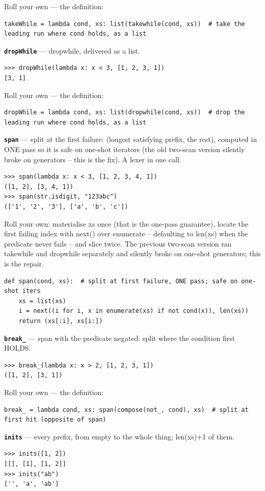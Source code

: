 \documentclass[10pt,letterpaper]{article}
\begin{document}
Roll your own --- the definition:

\begin{lstlisting}[style=ex]
takeWhile = lambda cond, xs: list(takewhile(cond, xs))  # take the leading run where cond holds, as a list
\end{lstlisting}
\textbf{\texttt{dropWhile}} --- dropwhile, delivered as a list.
\begin{lstlisting}[style=ex]
>>> dropWhile(lambda x: x < 3, [1, 2, 3, 1])
[3, 1]
\end{lstlisting}

Roll your own --- the definition:

\begin{lstlisting}[style=ex]
dropWhile = lambda cond, xs: list(dropwhile(cond, xs))  # drop the leading run where cond holds, as a list
\end{lstlisting}
\textbf{\texttt{span}} --- split at the first failure: (longest satisfying prefix, the rest), computed in ONE pass so it is safe on one-shot iterators (the old two-scan version silently broke on generators -- this is the fix). A lexer in one call.
\begin{lstlisting}[style=ex]
>>> span(lambda x: x < 3, [1, 2, 3, 4, 1])
([1, 2], [3, 4, 1])
>>> span(str.isdigit, "123abc")
(['1', '2', '3'], ['a', 'b', 'c'])
\end{lstlisting}

Roll your own: materialise xs once (that is the one-pass guarantee), locate the first failing index with next() over enumerate -- defaulting to len(xs) when the predicate never fails -- and slice twice. The previous two-scan version ran takewhile and dropwhile separately and silently broke on one-shot generators; this is the repair.

\begin{lstlisting}[style=ex]
def span(cond, xs):  # split at first failure, ONE pass; safe on one-shot iters
    xs = list(xs)
    i = next((i for i, x in enumerate(xs) if not cond(x)), len(xs))
    return (xs[:i], xs[i:])
\end{lstlisting}
\textbf{\texttt{break\_}} --- span with the predicate negated: split where the condition first HOLDS.
\begin{lstlisting}[style=ex]
>>> break_(lambda x: x > 2, [1, 2, 3, 1])
([1, 2], [3, 1])
\end{lstlisting}

Roll your own --- the definition:

\begin{lstlisting}[style=ex]
break_ = lambda cond, xs: span(compose(not_, cond), xs)  # split at first hit (opposite of span)
\end{lstlisting}
\textbf{\texttt{inits}} --- every prefix, from empty to the whole thing; len(xs)+1 of them.
\begin{lstlisting}[style=ex]
>>> inits([1, 2])
[[], [1], [1, 2]]
>>> inits("ab")
['', 'a', 'ab']
\end{lstlisting}
\end{document}
